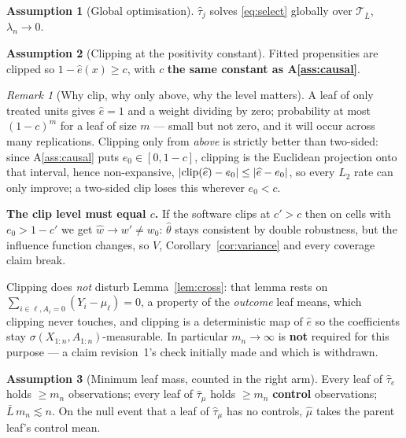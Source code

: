 \documentclass[11pt]{article}
\theoremstyle{plain}
\theoremstyle{definition}
\newtheorem{assumption}{Assumption}
\theoremstyle{remark}
\newtheorem{remark}{Remark}
\newcommand{\cT}{\mathcal{T}}
\newcommand{\ez}{e_0}
\newcommand{\wz}{w_0}
\newcommand{\ehat}{\widehat{e}}
\newcommand{\mhat}{\widehat{\mu}}
\newcommand{\what}{\widehat{w}}
\newcommand{\that}{\widehat{\tau}}
\newcommand{\thetahat}{\widehat{\theta}}
\DeclarePairedDelimiter{\abs}{\lvert}{\rvert}
\begin{document}
\begin{assumption}[Global optimisation]\label{ass:global}
$\that_j$ solves \eqref{eq:select} globally over $\cT_{\bar L}$, $\lambda_n\to0$.
\end{assumption}

\begin{assumption}[Clipping at the positivity constant]\label{ass:clip}
Fitted propensities are clipped so $1-\ehat(x)\ge c$, with $c$ \textbf{the same
constant as A\ref{ass:causal}}.
\end{assumption}

\begin{remark}[Why clip, why only above, why the level matters]\label{rem:clip}
A leaf of only treated units gives $\ehat=1$ and a weight dividing by zero;
probability at most $(1-c)^m$ for a leaf of size $m$ --- small but not zero, and
it will occur across many replications. Clipping only from \emph{above} is
strictly better than two-sided: since A\ref{ass:causal} puts $\ez\in[0,1-c]$,
clipping is the Euclidean projection onto that interval, hence non-expansive,
$\abs{\mathrm{clip}(\ehat)-\ez}\le\abs{\ehat-\ez}$, so every $L_2$ rate can only
improve; a two-sided clip loses this wherever $\ez<c$.

\textbf{The clip level must equal $c$.} If the software clips at $c'>c$ then on
cells with $\ez>1-c'$ we get $\what\to w'\ne\wz$: $\thetahat$ stays consistent by
double robustness, but the influence function changes, so $V$,
Corollary~\ref{cor:variance} and every coverage claim break.

Clipping does \emph{not} disturb Lemma~\ref{lem:cross}: that lemma rests on
$\sum_{i\in\ell,A_i=0}(Y_i-\mhat_\ell)=0$, a property of the \emph{outcome} leaf
means, which clipping never touches, and clipping is a deterministic map of
$\ehat$ so the coefficients stay $\sigma(X_{1:n},A_{1:n})$-measurable. In
particular $m_n\to\infty$ is \textbf{not} required for this purpose --- a claim
revision~1's check initially made and which is withdrawn.
\end{remark}

\begin{assumption}[Minimum leaf mass, counted in the right arm]\label{ass:mass}
Every leaf of $\that_e$ holds $\ge m_n$ observations; every leaf of $\that_\mu$
holds $\ge m_n$ \textbf{control} observations; $\bar L\,m_n\lesssim n$. On the
null event that a leaf of $\that_\mu$ has no controls, $\mhat$ takes the parent
leaf's control mean.
\end{assumption}
\end{document}
